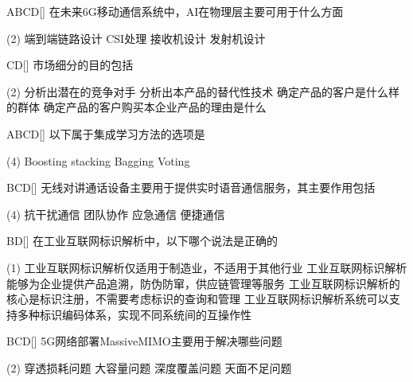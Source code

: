 \begin{choice}{\;ABCD\;}[]
    在未来6G移动通信系统中，AI在物理层主要可用于什么方面
    \begin{tasks}(2)
        \task 端到端链路设计
        \task CSI处理
        \task 接收机设计
        \task 发射机设计
    \end{tasks}
\end{choice}

\begin{choice}{\;CD\;}[]
    市场细分的目的包括
    \begin{tasks}(2)
        \task 分析出潜在的竞争对手
        \task 分析出本产品的替代性技术
        \task 确定产品的客户是什么样的群体
        \task 确定产品的客户购买本企业产品的理由是什么
    \end{tasks}
\end{choice}


\begin{choice}{\;ABCD\;}[]
    以下属于集成学习方法的选项是
    \begin{tasks}(4)
        \task Boosting
        \task stacking
        \task Bagging
        \task Voting
    \end{tasks}
\end{choice}

\begin{choice}{\;BCD\;}[]
    无线对讲通话设备主要用于提供实时语音通信服务，其主要作用包括
    \begin{tasks}(4)
        \task 抗干扰通信
        \task 团队协作
        \task 应急通信
        \task 便捷通信
    \end{tasks}
\end{choice}

\begin{choice}{\;BD\;}[]
    在工业互联网标识解析中，以下哪个说法是正确的
    \begin{tasks}(1)
        \task 工业互联网标识解析仅适用于制造业，不适用于其他行业
        \task 工业互联网标识解析能够为企业提供产品追溯，防伪防窜，供应链管理等服务
        \task 工业互联网标识解析的核心是标识注册，不需要考虑标识的查询和管理
        \task 工业互联网标识解析系统可以支持多种标识编码体系，实现不同系统间的互操作性
    \end{tasks}
\end{choice}


\begin{choice}{\;BCD\;}[]
    5G网络部署Massive\;MIMO主要用于解决哪些问题
    \begin{tasks}(2)
        \task 穿透损耗问题
        \task 大容量问题
        \task 深度覆盖问题
        \task 天面不足问题
    \end{tasks}
\end{choice}



